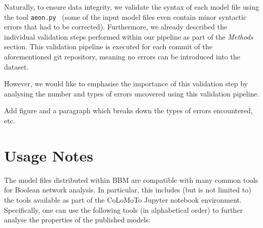 \documentclass[fleqn,10pt]{wlscirep}
\newcommand{\todo}[1]{{\color{red} #1}}
\begin{document}
Naturally, to ensure data integrity, we validate the syntax of each model file using the tool \texttt{aeon.py}~\cite{aeonpy} (some of the input model files even contain minor syntactic errors that had to be corrected). Furthermore, we already described the individual validation steps performed within our pipeline as part of the \emph{Methods} section. This validation pipeline is executed for each commit of the aforementioned git repository, meaning no errors can be introduced into the dataset. 

However, we would like to emphasise the importance of this validation step by analysing the number and types of errors uncovered using this validation pipeline.

\todo{Add figure and a paragraph which breaks down the types of errors encountered, etc.}


\section*{Usage Notes}

The model files distributed within BBM are compatible with many common tools for Boolean network analysis. In particular, this includes (but is not limited to) the tools available as part of the CoLoMoTo Jupyter notebook environment.~\cite{colomoto-notebook} Specifically, one can use the following tools (in alphabetical order) to further analyse the properties of the published models:
\end{document}
